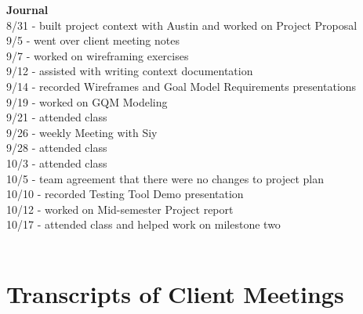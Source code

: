 \documentclass[oneside,openany,obeyspaces]{book}
\begin{document}
\begin{flushleft}
    \textbf{Journal\\}
    8/31 - built project context with Austin and worked on Project Proposal\\
    9/5 - went over client meeting notes\\
    9/7 - worked on wireframing exercises\\
    9/12 - assisted with writing context documentation\\
    9/14 - recorded Wireframes and Goal Model Requirements presentations\\
    9/19 - worked on GQM Modeling\\
    9/21 - attended class\\
    9/26 - weekly Meeting with Siy\\
    9/28 - attended class\\
    10/3 - attended class\\
    10/5 - team agreement that there were no changes to project plan\\
    10/10 - recorded Testing Tool Demo presentation\\
    10/12 - worked on Mid-semester Project report\\
    10/17 - attended class and helped work on milestone two\\~\\


    \section{Transcripts of Client Meetings}


    


    



\end{flushleft}
\end{document}
